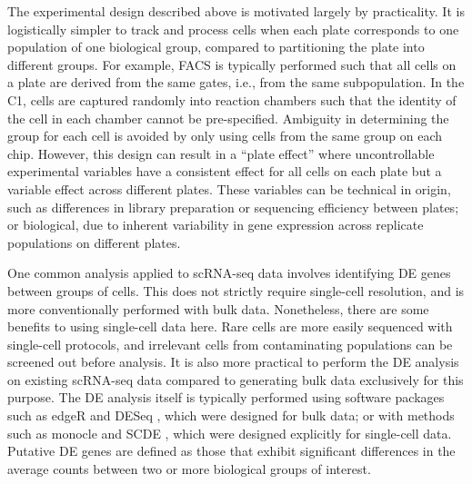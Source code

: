 \documentclass{article}
\begin{document}
The experimental design described above is motivated largely by practicality.
It is logistically simpler to track and process cells when each plate corresponds to one population of one biological group, compared to partitioning the plate into different groups.
For example, FACS is typically performed such that all cells on a plate are derived from the same gates, i.e., from the same subpopulation.
In the C1, cells are captured randomly into reaction chambers such that the identity of the cell in each chamber cannot be pre-specified.
Ambiguity in determining the group for each cell is avoided by only using cells from the same group on each chip.
However, this design can result in a ``plate effect'' where uncontrollable experimental variables have a consistent effect for all cells on each plate but a variable effect across different plates. 
These variables can be technical in origin, such as differences in library preparation or sequencing efficiency between plates; 
    or biological, due to inherent variability in gene expression across replicate populations on different plates.

One common analysis applied to scRNA-seq data involves identifying DE genes between groups of cells.
This does not strictly require single-cell resolution, and is more conventionally performed with bulk data.
Nonetheless, there are some benefits to using single-cell data here.
Rare cells are more easily sequenced with single-cell protocols, and irrelevant cells from contaminating populations can be screened out before analysis.
It is also more practical to perform the DE analysis on existing scRNA-seq data compared to generating bulk data exclusively for this purpose.
The DE analysis itself is typically performed using software packages such as edgeR \cite{robinson2010edgeR} and DESeq \cite{anders2010differential}, which were designed for bulk data;
    or with methods such as monocle \cite{trapnell2014dynamics} and SCDE \cite{kharchenko2014bayesian}, which were designed explicitly for single-cell data.
Putative DE genes are defined as those that exhibit significant differences in the average counts between two or more biological groups of interest.
\end{document}
